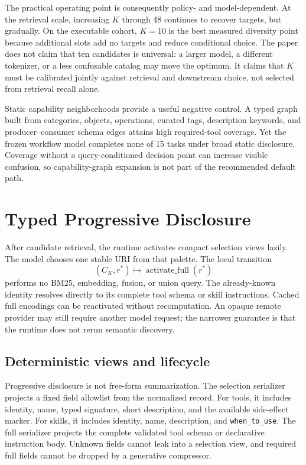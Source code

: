 \documentclass[11pt]{article}
\begin{document}
The practical operating point is consequently policy- and model-dependent.
At the retrieval scale, increasing $K$ through 48 continues to recover targets,
but gradually. On the executable cohort, $K=10$ is the best measured diversity
point because additional slots add no targets and reduce conditional choice.
The paper does not claim that ten candidates is universal: a larger model, a
different tokenizer, or a less confusable catalog may move the optimum. It
claims that $K$ must be calibrated jointly against retrieval and downstream
choice, not selected from retrieval recall alone.

Static capability neighborhoods provide a useful negative control. A typed
graph built from categories, objects, operations, curated tags, description
keywords, and producer--consumer schema edges attains high required-tool
coverage. Yet the frozen workflow model completes none of 15 tasks under broad
static disclosure. Coverage without a query-conditioned decision point can
increase visible confusion, so capability-graph expansion is not part of the
recommended default path.

\section{Typed Progressive Disclosure}

After candidate retrieval, the runtime activates compact selection views lazily.
The model chooses one stable URI from that palette. The local transition
\[
(C_K,r^*)\longmapsto\operatorname{activate\_full}(r^*)
\]
performs no BM25, embedding, fusion, or union query. The already-known identity
resolves directly to its complete tool schema or skill instructions. Cached
full encodings can be reactivated without recomputation. An opaque remote
provider may still require another model request; the narrower guarantee is
that the runtime does not rerun semantic discovery.

\subsection{Deterministic views and lifecycle}

Progressive disclosure is not free-form summarization. The selection serializer
projects a fixed field allowlist from the normalized record. For tools, it
includes identity, name, typed signature, short description, and the available
side-effect marker. For skills, it includes identity, name, description, and
\texttt{when\_to\_use}. The full serializer projects the complete validated
tool schema or declarative instruction body. Unknown fields cannot leak into a
selection view, and required full fields cannot be dropped by a generative
compressor.
\end{document}
